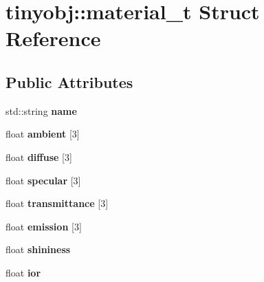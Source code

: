 \hypertarget{structtinyobj_1_1material__t}{}\section{tinyobj\+:\+:material\+\_\+t Struct Reference}
\label{structtinyobj_1_1material__t}
\subsection*{Public Attributes}
\begin{DoxyCompactItemize}
\item 
\mbox{\label{structtinyobj_1_1material__t_a41fde82dd0ec383b1d4ee258c4e4a1b9}} 
std\+::string {\bfseries name}
\item 
\mbox{\label{structtinyobj_1_1material__t_a43b73b4858f8901eea238e007c8719ce}} 
float {\bfseries ambient} \mbox{[}3\mbox{]}
\item 
\mbox{\label{structtinyobj_1_1material__t_a6ca52b575604328ad4d5674b2891a780}} 
float {\bfseries diffuse} \mbox{[}3\mbox{]}
\item 
\mbox{\label{structtinyobj_1_1material__t_a7bbad62eae583d5c381909f1f4f76471}} 
float {\bfseries specular} \mbox{[}3\mbox{]}
\item 
\mbox{\label{structtinyobj_1_1material__t_a40e7cf9bc5c2cf9048152d39be6b82d7}} 
float {\bfseries transmittance} \mbox{[}3\mbox{]}
\item 
\mbox{\label{structtinyobj_1_1material__t_ab84b63eb4a936b6fba7392cdcea6d6f6}} 
float {\bfseries emission} \mbox{[}3\mbox{]}
\item 
\mbox{\label{structtinyobj_1_1material__t_a4f893e510fd30f63c687a8ad53000d15}} 
float {\bfseries shininess}
\item 
\mbox{\label{structtinyobj_1_1material__t_aaa7d5495ba26b249e2ea3c368b505b56}} 
float {\bfseries ior}
\item 
\mbox{\label{structtinyobj_1_1material__t_ac7dfb767305c4225c5b3a964acb9498d}} 

\end{DoxyCompactItemize}
